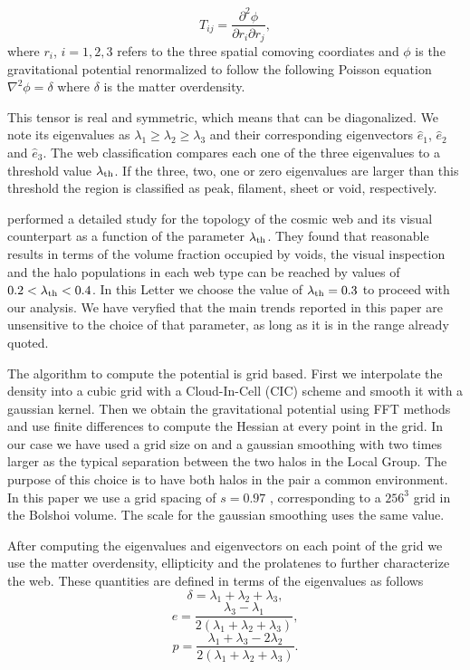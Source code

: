 \documentclass{emulateapj}
\newcommand{\hMpc}{{\ifmmode{h^{-1}{\rm Mpc}}\else{$h^{-1}$Mpc }\fi}}
\begin{document}
\begin{equation}
T_{ij} = \frac{\partial^2 \phi}{\partial r_i \partial r_j}, 
\end{equation}
%
where $r_{i}$, $i=1,2,3$ refers to the three spatial comoving
coordiates and $\phi$ is the gravitational potential renormalized to
follow the following Poisson equation $\nabla^2\phi=\delta$ where
$\delta$ is the matter overdensity.  

This tensor is real and symmetric, which means that can be
diagonalized. We note its eigenvalues as $\lambda_1\geq \lambda_2\geq
\lambda_3$ and their corresponding eigenvectors $\hat{e}_1$,
$\hat{e}_2$ and $\hat{e}_3$. The web classification compares each one
of the three eigenvalues to a threshold value $\lambda_{\rm th}$. If
the three, two, one or zero eigenvalues are larger than this threshold
the region is classified as peak, filament, sheet or void,
respectively.  

\cite{Tweb} performed a detailed study for the topology of the
cosmic web and its visual counterpart as a function of the parameter
$\lambda_{\rm th}$. They found that reasonable results in terms of the
volume fraction occupied by voids, the visual inspection and the halo
populations in each web type can be reached by values of $0.2<\lambda_{\rm
th}<0.4$. In this Letter we choose the value of $\lambda_{\rm
  th}=0.3$ to proceed with our analysis. We have veryfied that the
main trends reported in this paper are unsensitive to the choice of
that parameter, as long as it is in the range already quoted.

The algorithm to compute the potential is grid based. First we
interpolate the density into a cubic grid with a Cloud-In-Cell (CIC)
scheme and smooth it with a gaussian kernel. Then we obtain the
gravitational potential using FFT methods and use finite differences
to compute the Hessian at every point in the grid. In our case we have
used a grid size on and a gaussian smoothing with two times larger as
the typical separation between the two halos in the Local Group. The
purpose of this choice is to have both halos in the pair a common
environment. In this paper we use a grid spacing of $s=0.97$ \hMpc,
corresponding to a $256^3$ grid in the Bolshoi volume. The scale for
the gaussian smoothing uses the same value.


After computing the eigenvalues and eigenvectors on each point of the
grid we use the matter overdensity, ellipticity and the prolatenes to
further characterize the web. These quantities are defined in terms of the
eigenvalues as follows 
%
\begin{equation}
\delta = \lambda_1 + \lambda_2 + \lambda_3,
\end{equation}
%
\begin{equation}
e= \frac{\lambda_3 - \lambda_1}{2(\lambda_1 + \lambda_2 + \lambda_3)}, 
\end{equation}
%
\begin{equation}
p= \frac{\lambda_1 + \lambda_3 - 2\lambda_2}{2(\lambda_1 + \lambda_2 +
  \lambda_3)}.
\end{equation}
\end{document}
